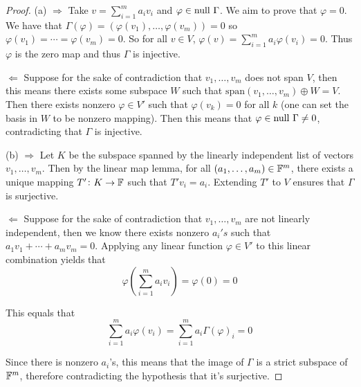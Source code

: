 \documentclass{extarticle}
\begin{document}
\begin{proof}
(a) \(\Rightarrow\) Take \(v = \sum_{i=1}^{m} a_i v_i\) and \(\varphi \in \text{null } \Gamma\). We 
aim to prove that \(\varphi = 0\). We have that \(\Gamma(\varphi) 
= (\varphi(v_1), \ldots, \varphi(v_m)) = 0\) so \(\varphi(v_1) = \cdots = \varphi(v_m) = 0\). 
So for all \(v \in V\), \(\varphi(v) = \sum_{i=1}^{m} a_i \varphi(v_i) = 0\). Thus \(\varphi\)
is the zero map and thus \(\Gamma\) is injective. 

\(\Leftarrow\) Suppose for the sake of contradiction that \(v_1, \ldots, v_m\) does not 
span \(V\), then this means there exists some subspace \(W\) such that \(\text{span}(v_1, \ldots, v_m)
\oplus W = V\). Then there exists nonzero \(\varphi \in V'\) such that \(\varphi(v_k) = 0\) for all  
\(k\) (one can set the basis in \(W\) to be nonzero mapping). Then this means that \(\varphi \in 
\text{null } \Gamma \neq 0\), contradicting that \(\Gamma\) is injective.  


(b) \(\Rightarrow\)  Let \(K\) be the subspace spanned by the linearly independent list of vectors 
\(v_1, \ldots, v_m\). Then by the linear map lemma, for all \((a_1, \ldots, a_m) \in \mathbb{F}^m\), there 
exists a unique mapping \(T' \colon K \to \mathbb{F}\) such that \(T' v_i = a_i\). Extending \(T'\) to \(V\)
ensures that \(\Gamma\) is surjective. 

\(\Leftarrow\) Suppose for the sake of contradiction that \(v_1, \ldots, v_m\) are not linearly 
independent, then we know there exists nonzero \(a_i's\) such that \(a_1 v_1 + \cdots + a_m 
v_m = 0\). Applying any linear function \(\varphi \in V'\) to this linear combination yields that 
\[\varphi \left(\sum_{i=1}^{m}a_i v_i \right) = \varphi(0) = 0\]

This equals that 
\[\sum_{i=1}^{m}a_i \varphi(v_i) = \sum_{i=1}^{m}a_i \Gamma(\varphi)_i = 0\]

Since there is nonzero \(a_i\)'s, this means that the image of \(\Gamma\) is a strict subspace 
of \(\mathbb{F}^m\), therefore contradicting the hypothesis that it's surjective.

\end{proof}
\end{document}
